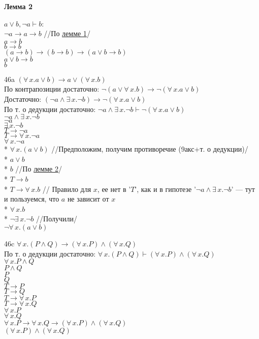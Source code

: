 \documentclass[12pt]{article}
\begin{document}
\bigskip

{\bf \hypertarget{lemma2}{Лемма 2}}

$a\vee b,\neg a\vdash b$:\\
$\neg a\to a\to b$ //По \hyperlink{lemma1}{лемме 1}/\\
$a\to b$\\
$b\to b$\\
$(a\to b)\to(b\to b)\to(a\vee b\to b)$\\
$a\vee b\to b$\\
$b$

\bigskip

46a $(\forall\,x.a\vee b)\to a\vee(\forall\,x.b)$\\
По контрапозиции достаточно: $\neg(a\vee\forall\,x.b)\to\neg(\forall\,x.a\vee b)$\\
Достаточно: $(\neg a\wedge\exists\,x.\neg b)\to \neg(\forall\,x.a\vee b)$\\
По т. о дедукции достаточно: $\neg a\wedge\exists\,x.\neg b\vdash\neg(\forall\,x.a\vee b)$\\
$\neg a\wedge\exists\,x.\neg b$\\
$\neg a$\\
$\exists\,x.\neg b$\\
$T\to\neg a$\\
$T\to\forall\,x.\neg a$\\
$\forall\,x.\neg a$\\
* $\forall\,x.(a\vee b)$ //Предположим, получим противоречие (9акс+т. о дедукции)/\\
* $a\vee b$\\
* $b$ //По \hyperlink{lemma2}{лемме 2}/\\
* $T\to b$\\
* $T\to\forall\,x.b$ // Правило для $x$, ее нет в '$T$', как и в гипотезе '$\neg a\wedge\exists\,x.\neg b$' --- тут и пользуемся, что $a$ не зависит от $x$\\
* $\forall\,x.b$\\
* $\neg\exists\,x.\neg b$ //Получили/\\
$\neg\forall\,x.(a\vee b)$

\bigskip

46c $\forall\,x.(P\wedge Q)\to (\forall\,x.P)\wedge(\forall\,x.Q)$\\
По т. о дедукции достаточно: $\forall\,x.(P\wedge Q)\vdash (\forall\,x.P)\wedge(\forall\,x.Q)$\\
$\forall\,x.P\wedge Q$\\
$P\wedge Q$\\
$P$\\
$Q$\\
$T\to P$\\
$T\to Q$\\
$T\to \forall\,x.P$\\
$T\to \forall\,x.Q$\\
$\forall\,x.P$\\
$\forall\,x.Q$\\
$\forall\,x.P\to\forall\,x.Q\to(\forall\,x.P)\wedge(\forall\,x.Q)$\\
$(\forall\,x.P)\wedge(\forall\,x.Q)$
\end{document}

